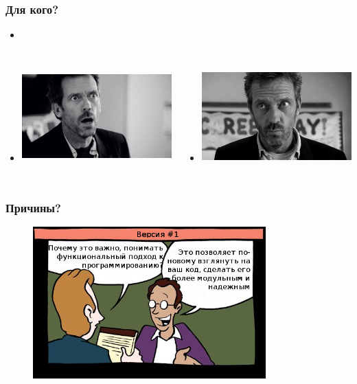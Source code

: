 \documentclass[18pt, compress]{beamer}
\begin{document}
\begin{frame}[fragile]
    \frametitle{Для кого?}
    \begin{itemize}[leftmargin=*]
        \item <+->
    \end{itemize}

    \vspace{-40pt}

    \begin{columns}[T,onlytextwidth]
    \begin{itemize}[leftmargin=*]
        \item <+->\includegraphics[width=6cm,height=3.5cm]{house1.jpeg}
    \end{itemize}

    \vspace{20pt}

    \begin{itemize}[leftmargin=*]
        \item <+->\includegraphics[width=6cm,height=3.5cm]{house2.png}
    \end{itemize}
    \end{columns}
\end{frame}

\begin{frame}
    \frametitle{Причины?}
    \vspace{-25pt}
    \begin{figure}
        \includegraphics[width=0.8\textwidth,center]{first_option.png}
    \end{figure}
\end{frame}
\end{document}
